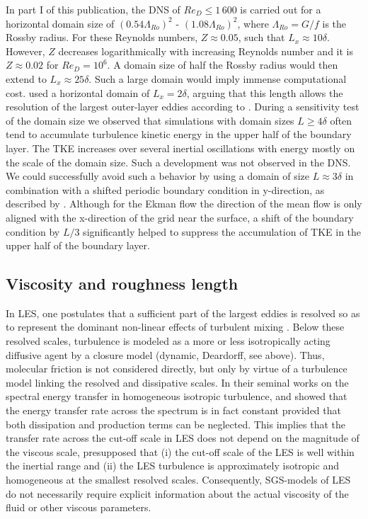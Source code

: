 \documentclass[smallcondensed,draft]{svjour3} %
\begin{document}
In part I of this publication, the DNS of $Re_D\leq1\,600$ is carried out for a horizontal domain size of $(0.54\Lambda_{Ro})^2$ - $(1.08\Lambda_{Ro})^2$, where $\Lambda_{Ro}=G/f$ is the Rossby radius. For these Reynolds numbers, $Z\approx 0.05$, such that $L_x \approx 10 \delta$. However, $Z$ decreases logarithmically with increasing Reynolds number and it is $Z\approx 0.02$ for $Re_D=10^6$. A domain size of half the Rossby radius would then extend to $L_x\approx 25\delta$. Such a large domain would imply immense computational cost. \cite{spalart2008direct} used a horizontal domain of $L_x = 2\delta$, arguing that this length allows the resolution of the largest outer-layer eddies according to \cite{csanady1967resistance}. During a sensitivity test of the domain size we observed that simulations with domain sizes $L\geq 4\delta$ often tend to accumulate turbulence kinetic energy in the upper half of the boundary layer. The TKE increases over several inertial oscillations with energy mostly on the scale of the domain size. Such a development was not observed in the DNS. We could successfully avoid such a behavior by using a domain of size $L \approx 3\delta$ in combination with a shifted periodic boundary condition in y-direction, as described by \cite{munters2016shifted}. Although for the Ekman flow the direction of the mean flow is only aligned with the x-direction of the grid near the surface, a shift of the boundary condition by $L/3$ significantly helped to suppress the accumulation of TKE in the upper half of the boundary layer.

\subsection{Viscosity and roughness length}

In LES, one postulates that a sufficient part of the largest eddies is resolved so as to represent the dominant non-linear effects of turbulent mixing \citep{pope2004ten}. Below these resolved scales, turbulence is modeled as a more or less isotropically acting diffusive agent by a closure model (dynamic, Deardorff, see above). Thus, molecular friction is not considered directly, but only by virtue of a turbulence model linking the resolved and dissipative scales. In their seminal works on the spectral energy transfer in homogeneous isotropic turbulence, \cite{kolmogorov1941dissipation} and \cite{obukhov1941distribution} showed that the energy transfer rate across the spectrum is in fact constant provided that both dissipation and production terms can be neglected. This implies that the transfer rate across the cut-off scale in LES does not depend on the magnitude of the viscous scale, presupposed that (i) the cut-off scale of the LES is well within the inertial range and (ii) the LES turbulence is approximately isotropic and homogeneous at the smallest resolved scales. Consequently, SGS-models of LES do not necessarily require explicit information about the actual viscosity of the fluid or other viscous parameters.
\end{document}
